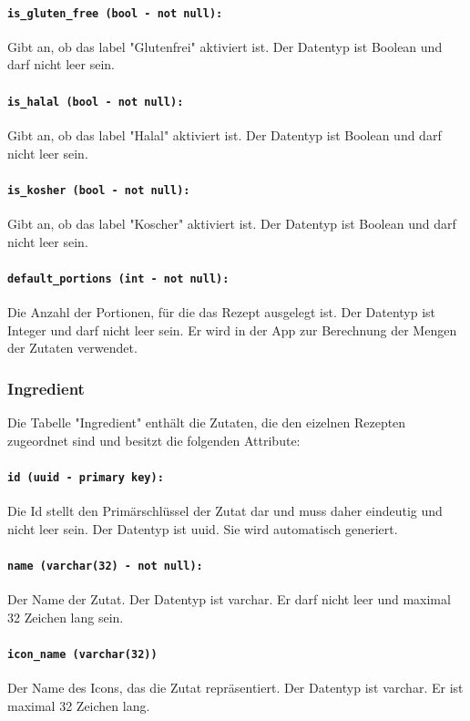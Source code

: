 \documentclass{entwurfsheft}
\begin{document}
\paragraph{\texttt{is\_gluten\_free (bool - not null):}} Gibt an, ob das \Gls{label} "Glutenfrei" aktiviert ist. Der Datentyp ist Boolean und darf nicht leer sein.
\paragraph{\texttt{is\_halal (bool - not null):}} Gibt an, ob das \Gls{label} "Halal" aktiviert ist. Der Datentyp ist Boolean und darf nicht leer sein.
\paragraph{\texttt{is\_kosher (bool - not null):}} Gibt an, ob das \Gls{label} "Koscher" aktiviert ist. Der Datentyp ist Boolean und darf nicht leer sein.
\paragraph{\texttt{default\_portions (int - not null):}} Die Anzahl der Portionen, für die das Rezept ausgelegt ist. Der Datentyp ist Integer und darf nicht leer sein. Er wird in der App zur Berechnung der Mengen der Zutaten verwendet.
\newpage
\subsubsection{Ingredient}
Die Tabelle "Ingredient" enthält die Zutaten, die den eizelnen Rezepten zugeordnet sind und besitzt die folgenden Attribute:
\paragraph{\texttt{id (uuid - primary key):}} Die Id stellt den Primärschlüssel der Zutat dar und muss daher eindeutig und nicht leer sein. Der Datentyp ist \Gls{uuid}. Sie wird automatisch generiert.
\paragraph{\texttt{name (varchar(32) - not null):}} Der Name der Zutat. Der Datentyp ist \Gls{varchar}. Er darf nicht leer und maximal 32 Zeichen lang sein.
\paragraph{\texttt{icon\_name (varchar(32))}} Der Name des Icons, das die Zutat repräsentiert. Der Datentyp ist \Gls{varchar}. Er ist maximal 32 Zeichen lang.
\end{document}

